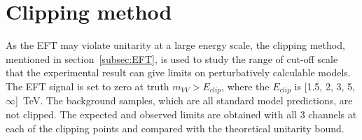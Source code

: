 \section{Clipping method}
\label{subsec:clipping}
As the EFT may violate unitarity at a large energy scale, the clipping method, mentioned in section~\ref{subsec:EFT}, is used to study the range of cut-off scale that the experimental result can give limits on perturbatively calculable models.
The EFT signal is set to zero at truth $m_{VV} > E_{clip}$, where the $E_{clip}$ is [1.5, 2, 3, 5, $\infty$]~TeV. 
The background samples, which are all standard model predictions, are not clipped.
The expected and observed limits are obtained with all 3 channels at each of the clipping points and compared with the theoretical unitarity bound.
